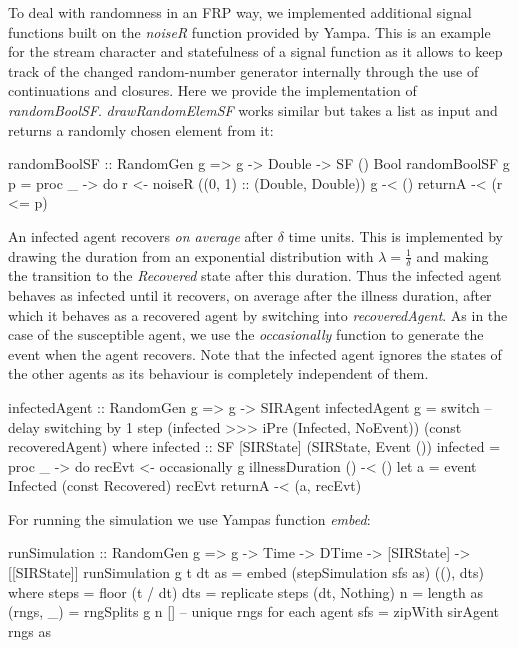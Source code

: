 To deal with randomness in an FRP way, we implemented additional signal functions built on the \textit{noiseR} function provided by Yampa. This is an example for the stream character and statefulness of a signal function as it allows to keep track of the changed random-number generator internally through the use of continuations and closures. Here we provide the implementation of \textit{randomBoolSF}. \textit{drawRandomElemSF} works similar but takes a list as input and returns a randomly chosen element from it:

\begin{HaskellCode}
randomBoolSF :: RandomGen g => g -> Double -> SF () Bool
randomBoolSF g p = proc _ -> do
  r <- noiseR ((0, 1) :: (Double, Double)) g -< ()
  returnA -< (r <= p)
\end{HaskellCode}

An infected agent recovers \textit{on average} after $\delta$ time units. This is implemented by drawing the duration from an exponential distribution \cite{borshchev_system_2004} with $\lambda = \frac{1}{\delta}$ and making the transition to the \textit{Recovered} state after this duration. Thus the infected agent behaves as infected until it recovers, on average after the illness duration, after which it behaves as a recovered agent by switching into \textit{recoveredAgent}. As in the case of the susceptible agent, we use the \textit{occasionally} function to generate the event when the agent recovers. Note that the infected agent ignores the states of the other agents as its behaviour is completely independent of them.

\begin{HaskellCode}
infectedAgent :: RandomGen g => g -> SIRAgent
infectedAgent g 
    = switch 
      -- delay switching by 1 step 
      (infected >>> iPre (Infected, NoEvent))
      (const recoveredAgent)
  where
    infected :: SF [SIRState] (SIRState, Event ())
    infected = proc _ -> do
      recEvt <- occasionally g illnessDuration () -< ()
      let a = event Infected (const Recovered) recEvt
      returnA -< (a, recEvt)
\end{HaskellCode}

For running the simulation we use Yampas function \textit{embed}:

\begin{HaskellCode}
runSimulation :: RandomGen g => g -> Time -> DTime -> [SIRState] -> [[SIRState]]
runSimulation g t dt as 
    = embed (stepSimulation sfs as) ((), dts)
  where
    steps     = floor (t / dt)
    dts       = replicate steps (dt, Nothing)
    n         = length as
    (rngs, _) = rngSplits g n [] -- unique rngs for each agent
    sfs       = zipWith sirAgent rngs as
\end{HaskellCode}

